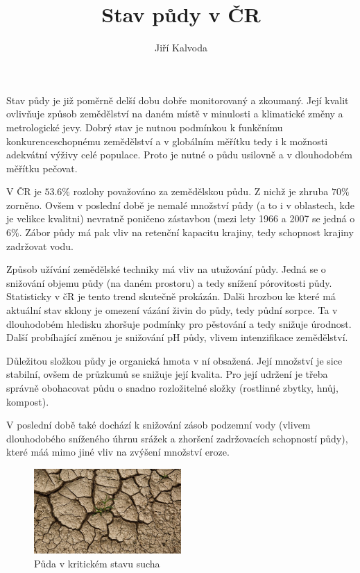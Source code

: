 \documentclass[a4paper]{article}
\begin{document}
\title{Stav půdy v ČR}
\author{Jiří Kalvoda}
\maketitle

Stav půdy je již poměrně delší dobu dobře monitorovaný a zkoumaný.
Její kvalit ovlivňuje způsob zemědělství na daném místě v minulosti a klimatické změny a metrologické jevy.
Dobrý stav je nutnou podmínkou k funkčnímu konkurenceschopnému zemědělství a v globálním měřítku tedy i k možnosti adekvátní výživy celé populace.
Proto je nutné o půdu usilovně a v dlouhodobém měřítku pečovat.

V ČR je $53.6\%$ rozlohy považováno za zemědělskou půdu.
Z nichž je zhruba $70\%$ zorněno.
Ovšem v poslední době je nemalé  množství půdy (a to i v oblastech, kde je velikce kvalitni) nevratně poničeno zástavbou (mezi lety 1966 a 2007 se jedná o $6\%$.
Zábor půdy má pak vliv na retenční kapacitu krajiny, tedy schopnost krajiny zadržovat vodu.

Způsob užívání zemědělské techniky má vliv na  utužování půdy. Jedná se o snižování objemu půdy (na daném prostoru) a tedy snížení pórovitosti půdy.
Statisticky v čR je tento trend skutečně prokázán.
Dalši hrozbou ke které má aktuální stav sklony je omezení vázání živin do půdy, tedy půdní sorpce. Ta v dlouhodobém hledisku zhoršuje podmínky pro pěstování a tedy snižuje úrodnost.
Další probíhající změnou je snižování pH půdy, vlivem intenzifikace zemědělství.

Důležitou složkou půdy je organická hmota v ní obsažená.
Její množství je sice stabilní, ovšem de průzkumů se snižuje její kvalita.
Pro její udržení je třeba správně obohacovat půdu o snadno rozložitelné složky (rostlinné zbytky, hnůj, kompost).

V poslední době také dochází k snižování zásob podzemní vody (vlivem dlouhodobého sníženého úhrnu srážek a zhoršení zadržovacích schopností půdy), které máá mimo jiné vliv na zvýšení množství  eroze.

\begin{figure}[tb]
\centering
\includegraphics[width=0.5\textwidth]{puda.jpg}
	\caption{Půda v kritickém stavu sucha}
\end{figure}
\end{document}
